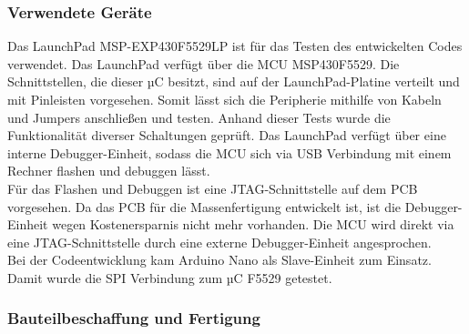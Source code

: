 \subsubsection{Verwendete Geräte}
Das LaunchPad MSP-EXP430F5529LP ist für das Testen des entwickelten Codes verwendet. Das LaunchPad verfügt über die MCU MSP430F5529. Die Schnittstellen, die dieser µC besitzt, sind auf der LaunchPad-Platine verteilt und mit Pinleisten vorgesehen. Somit lässt sich die Peripherie mithilfe von Kabeln und Jumpers anschließen und testen. Anhand dieser Tests wurde die Funktionalität diverser Schaltungen geprüft. Das LaunchPad verfügt über eine interne Debugger-Einheit, sodass die MCU sich via USB Verbindung mit einem Rechner  flashen und debuggen lässt.\\
Für das Flashen und Debuggen ist eine JTAG-Schnittstelle auf dem PCB vorgesehen. Da das PCB für die Massenfertigung entwickelt ist, ist die Debugger-Einheit wegen Kostenersparnis nicht mehr vorhanden. Die MCU wird direkt via eine JTAG-Schnittstelle durch eine externe Debugger-Einheit angesprochen.\\
Bei der Codeentwicklung kam Arduino Nano als Slave-Einheit zum Einsatz. Damit wurde die SPI Verbindung zum µC F5529 getestet. 
\subsubsection{Bauteilbeschaffung und Fertigung} 